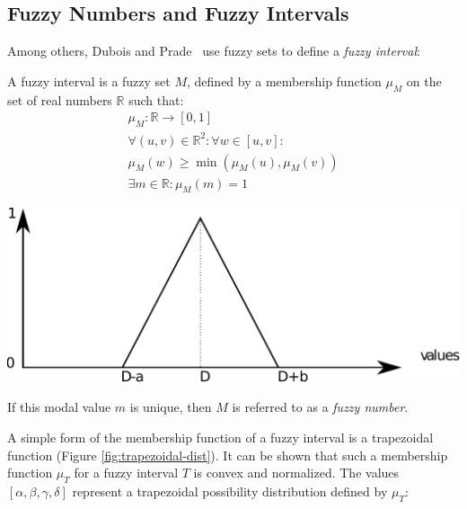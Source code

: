 \subsection{\label{subsec:fuzzy-numbers}Fuzzy Numbers and Fuzzy Intervals}
Among others, Dubois and Prade~\cite{Dubois1983} use fuzzy sets \cite{Zadeh1965} to define a \emph{fuzzy interval}:
\begin{definition}
A fuzzy interval is a fuzzy set $M$, defined by a membership function $\mu_{M}$ on the set of real numbers $\mathbb{R}$ such that:
\begin{eqnarray}
\mu_{M} :  \mathbb{R} \rightarrow \left[0,1\right]  \\ 
\nonumber
\forall (u,v)\in\mathbb{R}^2: \forall w \in [u,v]:\\
\nonumber
\mu_M(w) \geq\min(\mu_M(u),\mu_M(v))  \\
\nonumber
\exists m \in \mathbb{R} :  \mu_M(m)=1 
\end{eqnarray}
\end{definition}

\vspace*{13pt}
\begin{center}
{
\includegraphics[scale=0.25]{./graphs/triangular.pdf}

}
\end{center}
\vspace*{10pt}
\vspace*{13pt}

If this modal value $m$ is unique, then $M$ is referred to as a \emph{fuzzy number}. 

A simple form of the membership function of a fuzzy interval is a trapezoidal function (Figure \ref{fig:trapezoidal-dist}). It can be shown that such a membership function $\mu_T$ for a fuzzy interval $T$ is convex and normalized. The values $\left[\alpha, \beta, \gamma, \delta\right]$ represent a trapezoidal possibility distribution defined by $\mu_T$:

